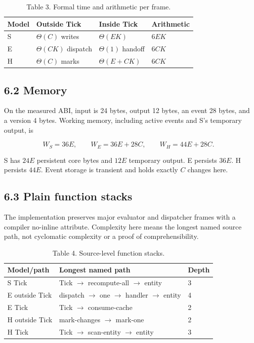 \begin{table}
\caption{Table 3. Formal time and arithmetic per frame.}
\begin{tabular}{llll}
Model & Outside Tick & Inside Tick & Arithmetic \\
\hline
S & \(\Theta(C)\) writes & \(\Theta(EK)\) & \(6EK\) \\
E & \(\Theta(CK)\) dispatch & \(\Theta(1)\) handoff & \(6CK\) \\
H & \(\Theta(C)\) marks & \(\Theta(E+CK)\) & \(6CK\) \\
\end{tabular}
\end{table}

\subsection{6.2 Memory}

On the measured ABI, input is 24 bytes, output 12 bytes, an event 28 bytes, and a version 4 bytes. Working memory, including active events and S's temporary output, is

\[
W_S=36E,\qquad W_E=36E+28C,\qquad W_H=44E+28C.
\]

S has \(24E\) persistent core bytes and \(12E\) temporary output. E persists \(36E\). H persists \(44E\). Event storage is transient and holds exactly \(C\) changes here.

\subsection{6.3 Plain function stacks}

The implementation preserves major evaluator and dispatcher frames with a compiler no-inline attribute. Complexity here means the longest named source path, not cyclomatic complexity or a proof of comprehensibility.

\begin{table}
\caption{Table 4. Source-level function stacks.}
\begin{tabular}{lll}
Model/path & Longest named path & Depth \\
\hline
S Tick & Tick \(\rightarrow\) recompute-all \(\rightarrow\) entity & 3 \\
E outside Tick & dispatch \(\rightarrow\) one \(\rightarrow\) handler \(\rightarrow\) entity & 4 \\
E Tick & Tick \(\rightarrow\) consume-cache & 2 \\
H outside Tick & mark-changes \(\rightarrow\) mark-one & 2 \\
H Tick & Tick \(\rightarrow\) scan-entity \(\rightarrow\) entity & 3 \\
\end{tabular}
\end{table}


